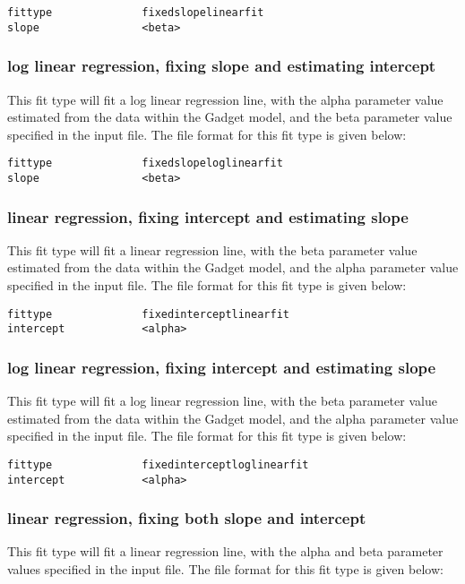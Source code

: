 \documentclass[10pt,twoside]{book}
\begin{document}
{\small\begin{verbatim}
fittype              fixedslopelinearfit
slope                <beta>
\end{verbatim}}

\subsubsection{log linear regression, fixing slope and estimating intercept}
This fit type will fit a log linear regression line, with the alpha parameter value estimated from the data within the Gadget model, and the beta parameter value specified in the input file.  The file format for this fit type is given below:

{\small\begin{verbatim}
fittype              fixedslopeloglinearfit
slope                <beta>
\end{verbatim}}

\subsubsection{linear regression, fixing intercept and estimating slope}
This fit type will fit a linear regression line, with the beta parameter value estimated from the data within the Gadget model, and the alpha parameter value specified in the input file.  The file format for this fit type is given below:

{\small\begin{verbatim}
fittype              fixedinterceptlinearfit
intercept            <alpha>
\end{verbatim}}

\subsubsection{log linear regression, fixing intercept and estimating slope}
This fit type will fit a log linear regression line, with the beta parameter value estimated from the data within the Gadget model, and the alpha parameter value specified in the input file.  The file format for this fit type is given below:

{\small\begin{verbatim}
fittype              fixedinterceptloglinearfit
intercept            <alpha>
\end{verbatim}}

\subsubsection{linear regression, fixing both slope and intercept}
This fit type will fit a linear regression line, with the alpha and beta parameter values specified in the input file.  The file format for this fit type is given below:
\end{document}
